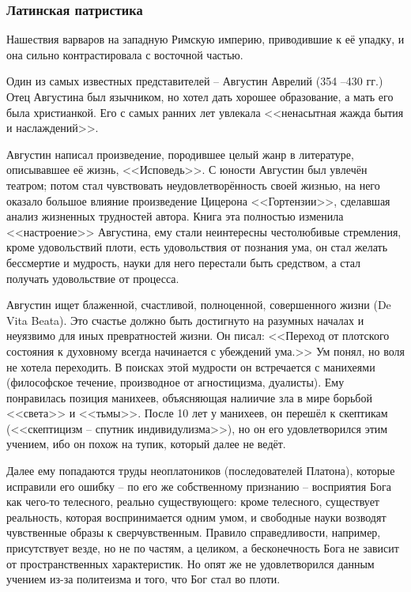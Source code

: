 \documentclass[a4paper, 12pt]{book} %
\begin{document}
\subsubsection{Латинская патристика}
Нашествия варваров на западную Римскую империю, приводившие к её  упадку, и она сильно контрастировала с восточной частью.

Один из самых известных представителей -- Августин Аврелий (354 --430 гг.) Отец Августина был язычником, но хотел дать хорошее образование, а мать его была христианкой. Его с самых ранних лет увлекала <<ненасытная жажда бытия и наслаждений>>. 

Августин написал произведение, породившее целый жанр в литературе, описывавшее её жизнь, <<Исповедь>>. С юности Августин был увлечён театром; потом стал чувствовать неудовлетворённость своей жизнью, на него оказало большое влияние произведение Цицерона <<Гортензии>>, сделавшая анализ жизненных трудностей автора. Книга эта полностью изменила <<настроение>> Августина, ему стали неинтересны честолюбивые стремления, кроме удовольствий плоти, есть удовольствия от познания ума, он стал желать бессмертие и мудрость, науки для него перестали быть средством, а стал получать удовольствие от процесса.

Августин ищет блаженной, счастливой, полноценной, совершенного жизни (De Vita Beata). Это счастье должно быть достигнуто на разумных началах и неуязвимо для иных превратностей жизни. Он писал: <<Переход от плотского состояния к духовному всегда начинается с убеждений ума.>> Ум понял, но воля не хотела переходить. В поисках этой мудрости он встречается с манихеями (философское течение, производное от агностицизма, дуалисты). Ему понравилась позиция манихеев, объясняющая налиичие зла в мире борьбой <<света>> и <<тьмы>>. После 10 лет у манихеев, он перешёл к скептикам (<<скептицизм -- спутник индивидулизма>>), но он его удовлетворился этим учением, ибо он похож на тупик, который далее не ведёт.

 Далее ему попадаются труды неоплатоников (последователей Платона), которые исправили его ошибку -- по его же собственному признанию -- восприятия Бога как чего-то телесного, реально существующего: кроме телесного, существует реальность, которая воспринимается одним умом, и свободные науки возводят чувственные образы к сверчувственным. Правило справедливости, например, присутствует везде, но не по частям, а целиком, а бесконечность Бога не зависит от пространственных характеристик. Но опят же не удовлетворился данным учением из-за политеизма и того, что Бог стал во плоти.
 
\end{document}
